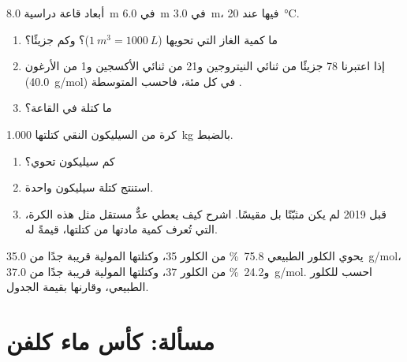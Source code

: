 \begin{exercise}[$\star\star\star$]\label{exo:g10:the-mole:13}
أبعاد قاعة دراسية \qty{8.0}{m} في \qty{6.0}{m} في \qty{3.0}{m}، 
فيها عند \qty{20}{\celsius}.
\begin{enumerate}
  \item ما كمية الغاز التي تحويها ($\qty{1}{m^3} =
        \qty{1000}{L}$)؟ وكم جزيئًا؟
  \item إذا اعتبرنا  78 جزيئًا من ثنائي النيتروجين و21 من ثنائي الأكسجين
        و1 من الأرغون (\qty{40.0}{g/mol}) في كل مئة، فاحسب  المتوسطة .
  \item ما كتلة  في القاعة؟
\end{enumerate}
\end{exercise}

\begin{exercise}[$\star\star\star$]\label{exo:g10:the-mole:14}
كرة من السيليكون النقي كتلتها \qty{1.000}{kg} بالضبط.
\begin{enumerate}
  \item كم  سيليكون تحوي؟
  \item استنتج كتلة  سيليكون واحدة.
  \item قبل 2019 لم يكن  مثبّتًا بل مقيسًا.
        اشرح كيف يعطي عدٌّ مستقل  مثل هذه الكرة، التي تُعرف
        كمية مادتها من كتلتها، قيمةً له.
\end{enumerate}
\end{exercise}

\begin{exercise}[$\star\star\star$]\label{exo:g10:the-mole:15}
يحوي الكلور الطبيعي \qty{75.8}{\percent} من  الكلور 35، وكتلتها
المولية قريبة جدًا من \qty{35.0}{g/mol}، و\qty{24.2}{\percent} من 
الكلور 37، وكتلتها المولية قريبة جدًا من \qty{37.0}{g/mol}.
احسب  للكلور الطبيعي، وقارنها
بقيمة الجدول.
\end{exercise}

\section{مسألة: كأس ماء كلفن}

